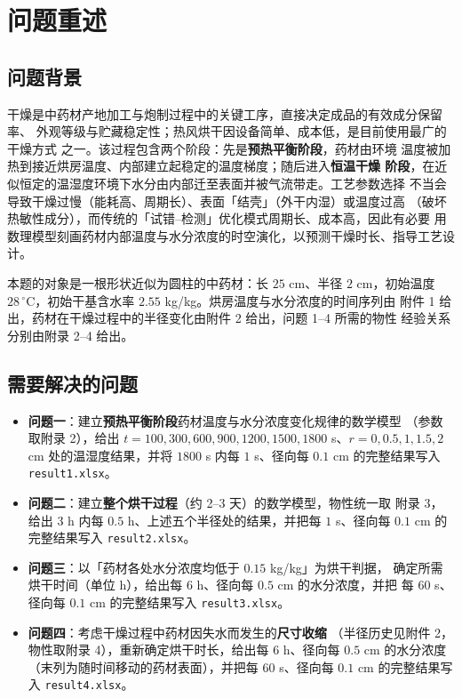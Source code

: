 \section{问题重述}

\subsection{问题背景}

干燥是中药材产地加工与炮制过程中的关键工序，直接决定成品的有效成分保留率、
外观等级与贮藏稳定性；热风烘干因设备简单、成本低，是目前使用最广的干燥方式
之一\cite{li2024,zhang2022}。该过程包含两个阶段：先是\textbf{预热平衡阶段}，药材由环境
温度被加热到接近烘房温度、内部建立起稳定的温度梯度；随后进入\textbf{恒温干燥
阶段}，在近似恒定的温湿度环境下水分由内部迁至表面并被气流带走。工艺参数选择
不当会导致干燥过慢（能耗高、周期长）、表面「结壳」（外干内湿）或温度过高
（破坏热敏性成分），而传统的「试错--检测」优化模式周期长、成本高，因此有必要
用数理模型刻画药材内部温度与水分浓度的时空演化，以预测干燥时长、指导工艺设计。

本题的对象是一根形状近似为圆柱的中药材：长 $25$ cm、半径 $2$ cm，初始温度
$28\,^\circ$C，初始干基含水率 $2.55$ kg/kg。烘房温度与水分浓度的时间序列由
附件 1 给出，药材在干燥过程中的半径变化由附件 2 给出，问题 1--4 所需的物性
经验关系分别由附录 2--4 给出。

\subsection{需要解决的问题}

\begin{itemize}
  \item \textbf{问题一}：建立\textbf{预热平衡阶段}药材温度与水分浓度变化规律的数学模型
  （参数取附录 2），给出 $t=100,300,600,900,1200,1500,1800$ s、$r=0,0.5,1,1.5,2$ cm
  处的温湿度结果，并将 $1800$ s 内每 $1$ s、径向每 $0.1$ cm 的完整结果写入
  \texttt{result1.xlsx}。
  \item \textbf{问题二}：建立\textbf{整个烘干过程}（约 2--3 天）的数学模型，物性统一取
  附录 3，给出 3 h 内每 $0.5$ h、上述五个半径处的结果，并把每 $1$ s、径向每
  $0.1$ cm 的完整结果写入 \texttt{result2.xlsx}。
  \item \textbf{问题三}：以「药材各处水分浓度均低于 $0.15$ kg/kg」为烘干判据，
  确定所需烘干时间（单位 h），给出每 $6$ h、径向每 $0.5$ cm 的水分浓度，并把
  每 $60$ s、径向每 $0.1$ cm 的完整结果写入 \texttt{result3.xlsx}。
  \item \textbf{问题四}：考虑干燥过程中药材因失水而发生的\textbf{尺寸收缩}
  （半径历史见附件 2，物性取附录 4），重新确定烘干时长，给出每 $6$ h、径向每
  $0.5$ cm 的水分浓度（末列为随时间移动的药材表面），并把每 $60$ s、径向每
  $0.1$ cm 的完整结果写入 \texttt{result4.xlsx}。
\end{itemize}

